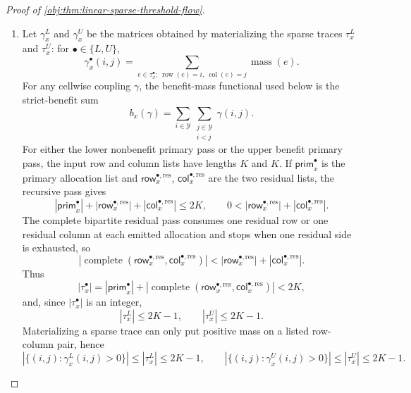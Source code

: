 \documentclass[11pt]{article}
\begin{document}
\begin{proof}[Proof of \cref{obj:thm:linear-sparse-threshold-flow}]
\begin{enumerate}
\item Let \(\gamma_x^L\) and \(\gamma_x^U\) be the matrices obtained by materializing the sparse traces \(\tau_x^L\) and \(\tau_x^U\): for \(\bullet\in\{L,U\}\),
\[
\gamma_x^\bullet(i,j)
=
\sum_{e\in\tau_x^\bullet:\ \operatorname{row}(e)=i,\ \operatorname{col}(e)=j}
\operatorname{mass}(e).
\]
For any cellwise coupling \(\gamma\), the benefit-mass functional used below is the strict-benefit sum
\[
b_x(\gamma)
=
\sum_{i\in\mathcal Y}\sum_{\substack{j\in\mathcal Y\\ i<j}}\gamma(i,j).
\]
For either the lower nonbenefit primary pass or the upper benefit primary pass, the input row and column lists have lengths \(K\) and \(K\).  If \(\mathsf{prim}_x^\bullet\) is the primary allocation list and \(\mathsf{row}_{x}^{\bullet,\mathrm{res}}\), \(\mathsf{col}_{x}^{\bullet,\mathrm{res}}\) are the two residual lists, the recursive pass gives
\[
|\mathsf{prim}_x^\bullet|
+|\mathsf{row}_{x}^{\bullet,\mathrm{res}}|
+|\mathsf{col}_{x}^{\bullet,\mathrm{res}}|
\le 2K,
\qquad
0<|\mathsf{row}_{x}^{\bullet,\mathrm{res}}|
+|\mathsf{col}_{x}^{\bullet,\mathrm{res}}|.
\]
The complete bipartite residual pass consumes one residual row or one residual column at each emitted allocation and stops when one residual side is exhausted, so
\[
|\operatorname{complete}(\mathsf{row}_{x}^{\bullet,\mathrm{res}},
\mathsf{col}_{x}^{\bullet,\mathrm{res}})|
<
|\mathsf{row}_{x}^{\bullet,\mathrm{res}}|
+|\mathsf{col}_{x}^{\bullet,\mathrm{res}}|.
\]
Thus
\[
|\tau_x^\bullet|
=
|\mathsf{prim}_x^\bullet|
+|\operatorname{complete}(\mathsf{row}_{x}^{\bullet,\mathrm{res}},
\mathsf{col}_{x}^{\bullet,\mathrm{res}})|
<2K,
\]
and, since \(|\tau_x^\bullet|\) is an integer,
\[
|\tau_x^L|\le 2K-1,
\qquad
|\tau_x^U|\le 2K-1.
\]
Materializing a sparse trace can only put positive mass on a listed row-column pair, hence
\[
|\{(i,j):\gamma_x^L(i,j)>0\}|\le |\tau_x^L|\le 2K-1,
\qquad
|\{(i,j):\gamma_x^U(i,j)>0\}|\le |\tau_x^U|\le 2K-1 .
\]


\end{enumerate}
\end{proof}
\end{document}
